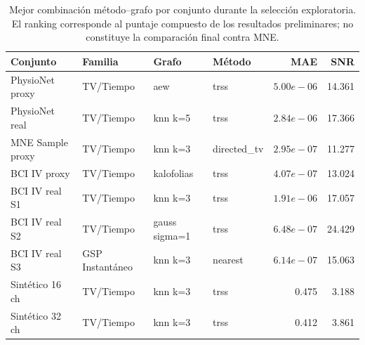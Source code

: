 \begin{table}[htbp]
\centering
\scriptsize
\setlength{\tabcolsep}{3pt}
\caption{Mejor combinación método--grafo por conjunto durante la selección exploratoria. El ranking corresponde al puntaje compuesto de los resultados preliminares; no constituye la comparación final contra MNE.}
\label{tab:ch4_preliminary_screening_top_candidates}
\begin{tabular}{@{}p{2.2cm}p{1.85cm}p{2.4cm}p{1.85cm}rr@{}}
\toprule
Conjunto & Familia & Grafo & Método & MAE & SNR \\
\midrule
PhysioNet proxy & TV/Tiempo & aew & trss & $5.00e-06$ & 14.361 \\
PhysioNet real & TV/Tiempo & knn k=5 & trss & $2.84e-06$ & 17.366 \\
MNE Sample proxy & TV/Tiempo & knn k=3 & directed\_tv & $2.95e-07$ & 11.277 \\
BCI IV proxy & TV/Tiempo & kalofolias & trss & $4.07e-07$ & 13.024 \\
BCI IV real S1 & TV/Tiempo & knn k=3 & trss & $1.91e-06$ & 17.057 \\
BCI IV real S2 & TV/Tiempo & gauss sigma=1 & trss & $6.48e-07$ & 24.429 \\
BCI IV real S3 & GSP Instantáneo & knn k=3 & nearest & $6.14e-07$ & 15.063 \\
Sintético 16 ch & TV/Tiempo & knn k=3 & trss & 0.475 & 3.188 \\
Sintético 32 ch & TV/Tiempo & knn k=3 & trss & 0.412 & 3.861 \\
\bottomrule
\end{tabular}
\end{table}
